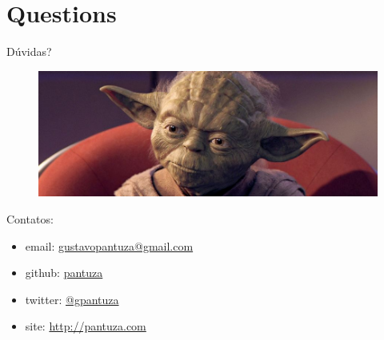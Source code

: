 \section{Questions}

\begin{frame}
  {Dúvidas?}

\begin{figure}[h]\vspace*{-1cm}
    \centering
    \includegraphics[scale=0.3,width=\linewidth]{images/questions}
\end{figure}

Contatos:

\begin{itemize}
\item email: \href{mailto:gustavopantuza@gmail.com}{gustavopantuza@gmail.com}
\item github: \href{http://github.com/pantuza}{pantuza}
\item twitter: \href{http://twitter.com/gpantuza}{@gpantuza}
\item site: \href{http://pantuza.com}{http://pantuza.com}
\end{itemize}

\end{frame}